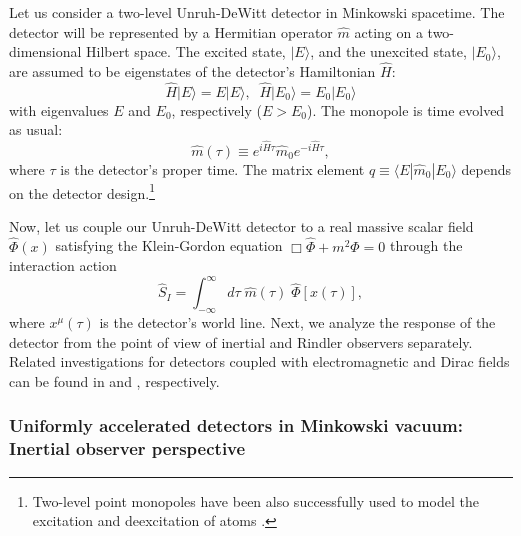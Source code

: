 \documentclass[12pt,nofootinbib,floatfix,aps,prd,showpacs,amsmath,amssymb,eqsecnum]{revtex4-2}
\let\cite\citep
\begin{document}
Let us consider a two-level Unruh-DeWitt detector in 
Minkowski spacetime.
The detector will be represented by a Hermitian operator $\hat m$ acting
on a 
two-dimensional Hilbert space.  The excited state, $|E \rangle$, and the
unexcited state, $|E_0 \rangle$, are assumed to be eigenstates of 
the detector's Hamiltonian $\hat H$:
\begin{equation}
\hat H | E   \rangle = E   | E    \rangle,\;\;
\hat H | E_0 \rangle = E_0 | E_0  \rangle
\end{equation}
with eigenvalues $E$ and $E_0$, respectively ($E>E_0$). The
monopole is time evolved as usual:
\begin{equation}
\hat m(\tau )\equiv e^{i\hat H \tau} \hat m_0 e^{-i\hat H \tau}, 
\label{m}
\end{equation}
where $\tau$ is the detector's proper time. The matrix element
$q \equiv \langle E | \hat m_0 | E_0 \rangle $
depends on the detector 
design.\footnote{Two-level point monopoles have been also 
successfully used to model the excitation and deexcitation of 
atoms  \cite{Audretschetal94, Zhuetal07}.}

Now, let us couple our Unruh-DeWitt detector to a real massive 
scalar field $\hat{\Phi}(x)$
satisfying the Klein-Gordon equation 
$\Box \hat{\Phi} +m^2 \hat{\Phi} = 0$ through the interaction action
\begin{equation}
     \hat S_I =
       \int_{-\infty}^{\infty}
       d\tau \; \hat m (\tau )\; 
\hat{\Phi}[x(\tau)],
  \label{SI1}
\end{equation}
where $x^\mu (\tau)$ is the detector's world line. 
Next, we analyze the response of the detector from the point of view 
of inertial and Rindler observers separately. Related investigations 
for detectors coupled with electromagnetic and Dirac fields can 
be found in \textcite{Boyer80,Boyer84} and \textcite{Iyeretal80}, 
respectively. 


\subsubsection{Uniformly accelerated detectors in Minkowski vacuum:
               Inertial observer perspective}
\label{subsubsection:uadinertial}
\end{document}
